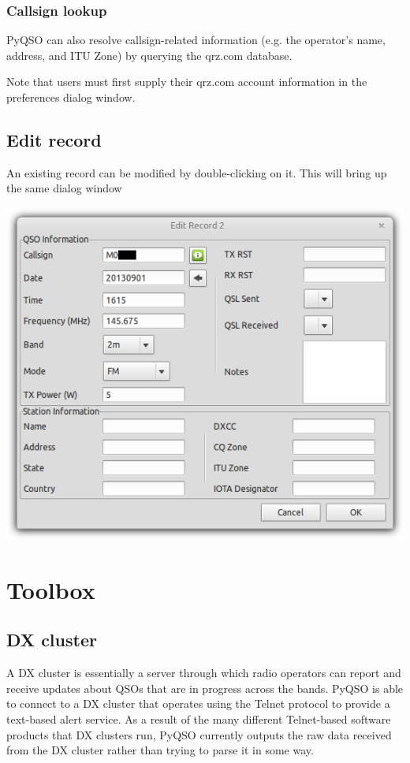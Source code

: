 \documentclass[11pt, a4paper]{report}
\begin{document}
\subsection{Callsign lookup}
PyQSO can also resolve callsign-related information (e.g. the operator's name, address, and ITU Zone) by querying the qrz.com database.

Note that users must first supply their qrz.com account information in the preferences dialog window.

\section{Edit record}
An existing record can be modified by double-clicking on it. This will bring up the same dialog window

\begin{center}
  \includegraphics[width=1\columnwidth]{images/edit_record.png}
\end{center}

\chapter{Toolbox}\label{chap:toolbox}

\section{DX cluster}
A DX cluster is essentially a server through which radio operators can report and receive updates about QSOs that are in progress across the bands. PyQSO is able to connect to a DX cluster that operates using the Telnet protocol to provide a text-based alert service. As a result of the many different Telnet-based software products that DX clusters run, PyQSO currently outputs the raw data received from the DX cluster rather than trying to parse it in some way.
\end{document}
